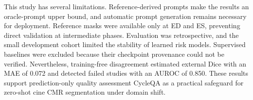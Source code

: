 \documentclass[runningheads]{llncs}
\newcommand{\CQ}{CycleQA}
\begin{document}
This study has several limitations. Reference-derived prompts make the results an oracle-prompt upper bound, and automatic prompt generation remains necessary for deployment. Reference masks were available only at ED and ES, preventing direct validation at intermediate phases. Evaluation was retrospective, and the small development cohort limited the stability of learned risk models. Supervised baselines were excluded because their checkpoint provenance could not be verified. Nevertheless, training-free disagreement estimated external Dice with an MAE of 0.072 and detected failed studies with an AUROC of 0.850. These results support prediction-only quality assessment \CQ{} as a practical safeguard for zero-shot cine CMR segmentation under domain shift.


\end{document}

